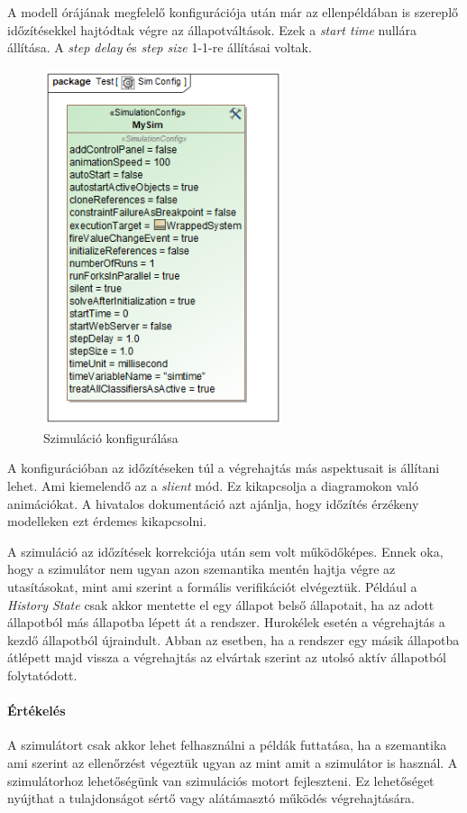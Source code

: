 A modell órájának megfelelő konfigurációja után már az ellenpéldában is szereplő időzítésekkel hajtódtak végre az állapotváltások. Ezek a \emph{start time} nullára állítása. A \emph{step delay} és \emph{step size} 1-1-re állításai voltak.
\begin{figure}[!ht]
	\centering
	\includegraphics[width=70mm, keepaspectratio]{figures/contribution/Sim Config.png}
	\caption{Szimuláció konfigurálása}
	\label{fig:simconf}
\end{figure}
A konfigurációban az időzítéseken túl a végrehajtás más aspektusait is állítani lehet. Ami kiemelendő az a \emph{slient} mód. Ez kikapcsolja a diagramokon való animációkat. A  hivatalos dokumentáció azt ajánlja, hogy időzítés érzékeny modelleken ezt érdemes kikapcsolni. %


A szimuláció az időzítések korrekciója után sem volt működőképes. Ennek oka, hogy a szimulátor nem ugyan azon szemantika mentén hajtja végre az utasításokat, mint ami szerint a formális verifikációt elvégeztük. Például a \emph{History State} csak akkor mentette el egy állapot belső állapotait, ha az adott állapotból más állapotba lépett át a rendszer. Hurokélek esetén a végrehajtás a kezdő állapotból újraindult. Abban az esetben, ha a rendszer egy másik állapotba átlépett majd vissza a végrehajtás az elvártak szerint az utolsó aktív állapotból folytatódott.

\paragraph{Értékelés}
A szimulátort csak akkor lehet felhasználni a példák futtatása, ha a szemantika ami szerint az ellenőrzést végeztük ugyan az mint amit a szimulátor is használ. A szimulátorhoz lehetőségünk van szimulációs motort fejleszteni. Ez lehetőséget nyújthat a tulajdonságot sértő vagy alátámasztó működés végrehajtására.

